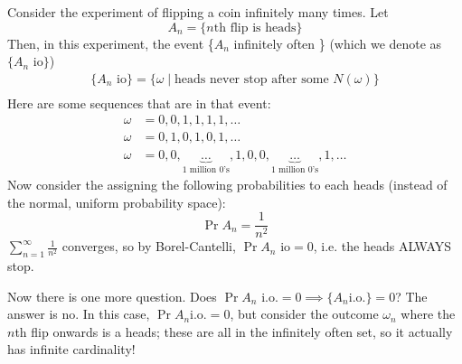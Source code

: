 \begin{example} 
    Consider the experiment of flipping a coin infinitely many times. Let
    \[ A_n = \{ \text{$n$th flip is heads} \} \]
    Then, in this experiment, the event \{$A_n$ infinitely often \} (which we denote as
    $\{A_n \text{ io}\}$)
    \begin{align*}
        \{A_n \text{ io} \} = \{ \omega \mid \text{heads never stop after some $N(\omega)$} \} \\
    \end{align*}
    Here are some sequences that are in that event:
    \begin{align*}
        \omega &= 0, 0, 1, 1, 1, 1, \dots \\
        \omega &= 0, 1, 0, 1, 0, 1, \dots \\
        \omega &= 0, 0, \underbrace{\dots}_{\text{1 million 0's}}, 1, 0, 0, \underbrace{\dots}_{\text{1 million 0's}}, 1, \dots
    \end{align*}
    Now consider the assigning the following probabilities to each heads (instead of the normal, uniform probability space):
    \[ \Pr{A_n} = \frac{1}{n^2} \]
    \(\sum_{n = 1}^{\infty} \frac{1}{n^2}\) converges, so by Borel-Cantelli, $\Pr{A_n \text{ io}} = 0$, i.e.
    the heads ALWAYS stop.

    Now there is one more question. Does $\Pr{A_n \text{ i.o.}} = 0 \implies \{A_n \text{i.o.}\} = 0$?
    The answer is no. In this case, $\Pr{A_n \text{i.o.}} = 0$, but consider the outcome $\omega_n$ where the $n$th
    flip onwards is a heads; these are all in the infinitely often set, so it actually has infinite cardinality!
\end{example}